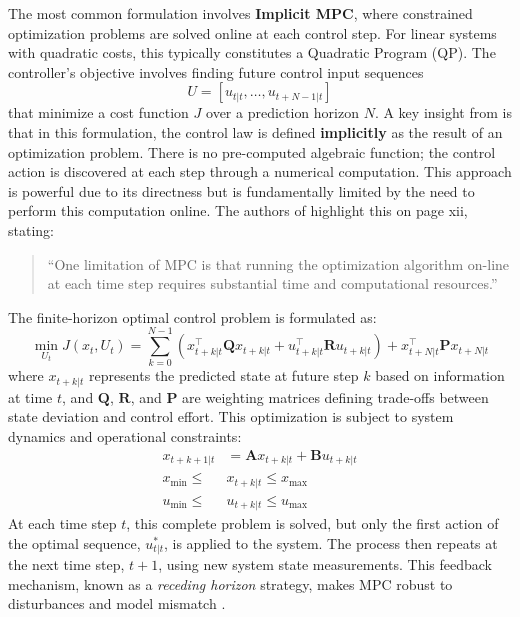 The most common formulation involves \textbf{Implicit MPC}, where constrained optimization problems are solved online at each control step. For linear systems with quadratic costs, this typically constitutes a Quadratic Program (QP). The controller's objective involves finding future control input sequences 
\[
U = [u_{t|t}, \dots, u_{t+N-1|t}]
\] 
that minimize a cost function $J$ over a prediction horizon $N$.
\noindent
A key insight from \cite{borrelli2017predictive} is that in this formulation, the control law is defined \textbf{implicitly} as the result of an optimization problem. There is no pre-computed algebraic function; the control action is discovered at each step through a numerical computation. This approach is powerful due to its directness but is fundamentally limited by the need to perform this computation online. The authors of \cite{borrelli2017predictive} highlight this on page xii, stating: 
\begin{quote}
“One limitation of MPC is that running the optimization algorithm on-line at each time step requires substantial time and computational resources.”
\end{quote}
\noindent
The finite-horizon optimal control problem is formulated as:
\begin{equation}
\min_{U_t} J(x_t, U_t) = \sum_{k=0}^{N-1} \left( x_{t+k|t}^\top \mathbf{Q} x_{t+k|t} + u_{t+k|t}^\top \mathbf{R} u_{t+k|t} \right) + x_{t+N|t}^\top \mathbf{P} x_{t+N|t}
\end{equation}
where $x_{t+k|t}$ represents the predicted state at future step $k$ based on information at time $t$, and $\mathbf{Q}$, $\mathbf{R}$, and $\mathbf{P}$ are weighting matrices defining trade-offs between state deviation and control effort. This optimization is subject to system dynamics and operational constraints:
\begin{align}
x_{t+k+1|t} &= \mathbf{A} x_{t+k|t} + \mathbf{B} u_{t+k|t} \\
x_{\min} \leq\ &x_{t+k|t} \leq x_{\max} \\
u_{\min} \leq\ &u_{t+k|t} \leq u_{\max}
\end{align}
\noindent
At each time step $t$, this complete problem is solved, but only the first action of the optimal sequence, $u_{t|t}^*$, is applied to the system. The process then repeats at the next time step, $t+1$, using new system state measurements. This feedback mechanism, known as a \textit{receding horizon} strategy, makes MPC robust to disturbances and model mismatch \cite{camacho2013model}.


